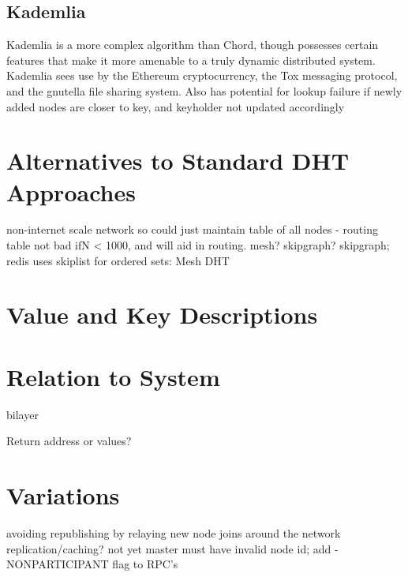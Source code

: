 \documentclass[10pt, a4paper]{article}
\begin{document}
\subsection{Kademlia}

Kademlia is a more complex algorithm than Chord, though possesses certain features that make it more amenable to a truly dynamic distributed system.
Kademlia sees use by the Ethereum cryptocurrency, the Tox messaging protocol, and the gnutella file sharing system.
Also has potential for lookup failure if newly added nodes are closer to key, and keyholder not updated accordingly

\section{Alternatives to Standard DHT Approaches}

non-internet scale network so could just maintain table of all nodes -  routing table not bad ifN < 1000, and will aid in routing. mesh? skipgraph?
skipgraph;
redis uses skiplist for ordered sets: %
Mesh DHT

\section{Value and Key Descriptions}

\section{Relation to System}
bilayer

Return address or values?

\section{Variations}
avoiding republishing by relaying new node joins around the network
replication/caching? not yet
master must have invalid node id; add -NONPARTICIPANT flag to RPC's

\end{document}
